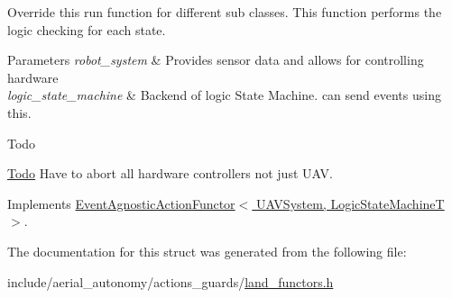 Override this run function for different sub classes. This function performs the logic checking for each state. 


\begin{DoxyParams}{Parameters}
{\em robot\-\_\-system} & Provides sensor data and allows for controlling hardware \\
\hline
{\em logic\-\_\-state\-\_\-machine} & Backend of logic State Machine. can send events using this. \\
\hline
\end{DoxyParams}
\begin{DoxyRefDesc}{Todo}
\item[\hyperlink{todo__todo000007}{Todo}]Have to abort all hardware controllers not just U\-A\-V. \end{DoxyRefDesc}


Implements \hyperlink{structEventAgnosticActionFunctor_a53a48938d68370ff2ef262222565ffcf}{Event\-Agnostic\-Action\-Functor$<$ U\-A\-V\-System, Logic\-State\-Machine\-T $>$}.



The documentation for this struct was generated from the following file\-:\begin{DoxyCompactItemize}
\item 
include/aerial\-\_\-autonomy/actions\-\_\-guards/\hyperlink{land__functors_8h}{land\-\_\-functors.\-h}\end{DoxyCompactItemize}
